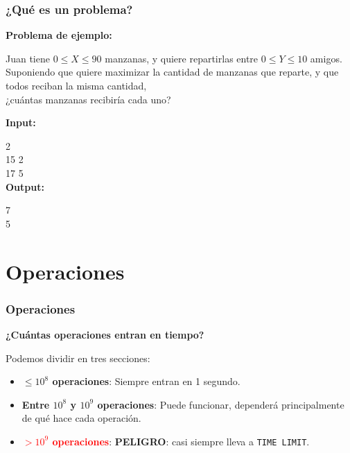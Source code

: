 \documentclass{beamer}
\begin{document}
\begin{frame}
  \frametitle{¿Qué es un problema?}

  \textbf{Problema de ejemplo:}
  
  Juan tiene $0 \leq X \leq 90$ manzanas, y quiere repartirlas entre $0 \leq Y \leq 10$ amigos. \\
  Suponiendo que quiere maximizar la cantidad de manzanas que reparte, y que todos reciban la misma cantidad,\\
  ¿cuántas manzanas recibiría cada uno?

  \textbf{Input:}

  2 \\
  15 2 \\
  17 5 \\

  \textbf{Output:}

  7 \\
  5 \\

\end{frame}


\section{Operaciones}

\begin{frame}
  \frametitle{Operaciones}

  \textbf{¿Cuántas operaciones entran en tiempo?}

  Podemos dividir en tres secciones:
  
  \begin{itemize}
    \item \textcolor{green!60!black}{\textbf{$\leq 10^8$ operaciones}}: Siempre entran en 1 segundo.
    \item \textcolor{orange!90!black}{\textbf{Entre $10^8$ y $10^9$ operaciones}}: Puede funcionar, dependerá principalmente de qué hace cada operación.
    \item \textcolor{red}{\textbf{$> 10^9$ operaciones}}: \textbf{PELIGRO}: casi siempre lleva a \texttt{TIME LIMIT}.
  \end{itemize}

\end{frame}
\end{document}
